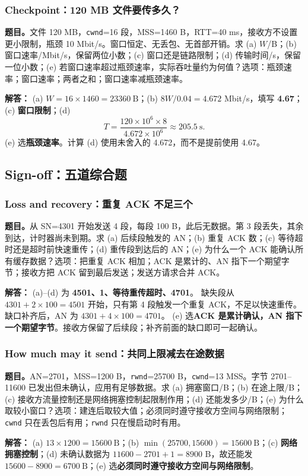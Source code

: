\documentclass[11pt,a4paper,fontset=fandol]{ctexart}
\renewcommand{\exercisequestion}[2]{%
  \Needspace{5\baselineskip}%
  \subsubsection{#2}\label{exercise:#1}%
}
\renewenvironment{checkedsolution}
  {\par\nopagebreak[4]\textbf{解答：}\ignorespaces}
  {\par}
\begin{document}
\exercisequestion{SC2008-HW05-Q06}{Checkpoint：120 MB 文件要传多久？}
\textbf{题目。}文件 120 MB，\texttt{cwnd}=16 段，MSS=1460 B，RTT=40 ms，接收方不设置更小限制，瓶颈 10 Mbit/s。窗口恒定、无丢包、无首部开销。求 (a) $W$/B；(b) 窗口速率/Mbit/s，保留两位小数；(c) 窗口还是链路限制；(d) 传输时间/s，保留一位小数；(e) 若窗口速率超过瓶颈速率，实际吞吐量约为何值？选项：瓶颈速率；窗口速率；两者之和；窗口速率减瓶颈速率。
\begin{checkedsolution}
(a) $W=16\times1460=\boxed{23360\ \mathrm{B}}$；(b) $8W/0.04=4.672$ Mbit/s，填写 \textbf{4.67}；(c) \textbf{窗口限制}；(d)
\[
 T=\frac{120\times10^6\times8}{4.672\times10^6}
 \approx\boxed{205.5\ \mathrm{s}}.
\]
(e) 选\textbf{瓶颈速率}。计算 (d) 使用未舍入的 4.672，而不是提前使用 4.67。
\end{checkedsolution}

\subsection{Sign-off：五道综合题}

\exercisequestion{SC2008-HW05-Q07}{Loss and recovery：重复 ACK 不足三个}
\textbf{题目。}从 SN=4301 开始发送 4 段，每段 100 B，此后无数据。第 3 段丢失，其余到达，计时器尚未到期。求 (a) 后续段触发的 AN；(b) 重复 ACK 数；(c) 等待超时还是超时前快速重传；(d) 重传段到达后的 AN；(e) 为什么一个 ACK 能确认所有缓存数据？选项：把重复 ACK 相加；ACK 是累计的、AN 指下一个期望字节；接收方把 ACK 留到最后发送；发送方请求合并 ACK。
\begin{checkedsolution}
(a)--(d) 为 \textbf{4501、1、等待重传超时、4701}。
缺失段从 $4301+2\times100=4501$ 开始，只有第 4 段触发一个重复 ACK，不足以快速重传。缺口补齐后，AN 为 $4301+4\times100=4701$。
(e) 选\textbf{ACK 是累计确认，AN 指下一个期望字节}。接收方保留了后续段；补齐前面的缺口即可一起确认。
\end{checkedsolution}

\exercisequestion{SC2008-HW05-Q08}{How much may it send：共同上限减去在途数据}
\textbf{题目。}AN=2701，MSS=1200 B，\texttt{rwnd}=25700 B，\texttt{cwnd}=13 MSS。字节 2701--11600 已发出但未确认，应用有足够数据。求 (a) 拥塞窗口/B；(b) 在途上限/B；(c) 接收方流量控制还是网络拥塞控制起限制作用；(d) 还能发多少/B；(e) 为什么取较小窗口？选项：建连后取较大值；必须同时遵守接收方空间与网络限制；\texttt{cwnd} 只在丢包后有用；\texttt{rwnd} 只在慢启动时有用。
\begin{checkedsolution}
(a) $13\times1200=\boxed{15600\ \mathrm{B}}$；(b) $\min(25700,15600)=\boxed{15600\ \mathrm{B}}$；(c) \textbf{网络拥塞控制}；(d) 未确认数据为 $11600-2701+1=8900$ B，故还能发 $15600-8900=\boxed{6700\ \mathrm{B}}$；(e) 选\textbf{必须同时遵守接收方空间与网络限制}。
\end{checkedsolution}
\end{document}
